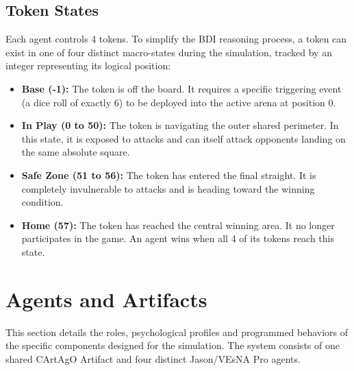 \documentclass[12pt]{article}
\begin{document}
\subsection{Token States}
\label{subsec:tokens}
\noindent Each agent controls 4 tokens. To simplify the BDI reasoning process, a token can exist in one of four distinct macro-states during the simulation, tracked by an integer representing its logical position:
\begin{itemize}
    \item \textbf{Base (-1):} The token is off the board. It requires a specific triggering event (a dice roll of exactly 6) to be deployed into the active arena at position 0.
    \item \textbf{In Play (0 to 50):} The token is navigating the outer shared perimeter. In this state, it is exposed to attacks and can itself attack opponents landing on the same absolute square.
    \item \textbf{Safe Zone (51 to 56):} The token has entered the final straight. It is completely invulnerable to attacks and is heading toward the winning condition.
     \item \textbf{Home (57):} The token has reached the central winning area. It no longer participates in the game. An agent wins when all 4 of its tokens reach this state.
\end{itemize}

\pagebreak
\section{Agents and Artifacts}
\label{sec:agents}
This section details the roles, psychological profiles and programmed behaviors of the specific components designed for the simulation.  The system
consists of one shared CArtAgO Artifact and four distinct Jason/VEsNA Pro agents.
\end{document}
